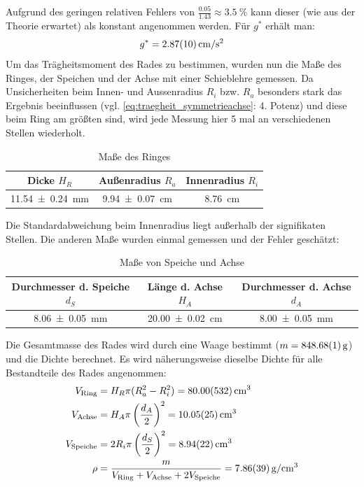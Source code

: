 Aufgrund des geringen relativen Fehlers von $\frac{0.05}{1.43}\approx\SI{3.5}{\percent}$ kann dieser (wie aus der Theorie erwartet) als konstant angenommen werden.
Für $g^*$ erhält man:
\begin{equation}
  g^*=\SI{2.87\pm .10}{cm/s^2}
  \label{eq:gsterngemessen}
\end{equation}
Um das Trägheitsmoment des Rades zu bestimmen, wurden nun die Maße des Ringes, der Speichen und der Achse mit einer Schieblehre gemessen. Da Unsicherheiten beim Innen- und Aussenradius $R_i$ bzw. $R_a$ besonders stark das Ergebnis beeinflussen (vgl. \cref{eq:traegheit_symmetrieachse}: 4. Potenz) und diese beim Ring am größten sind, wird jede Messung hier 5 mal an verschiedenen Stellen wiederholt.
\begin{table}[H]
  \centering
  \begin{tabular}{c | c | c}
    Dicke $H_R$ & Außenradius $R_a$ & Innenradius $R_i$ \\ \hline
    \SI{11.54\pm .24}{mm} & \SI{9.94\pm .07}{cm} & \SI{8.76}{cm}
  \end{tabular}
  \caption{Maße des Ringes}
  \label{tab:ringwerte}
\end{table}
Die Standardabweichung beim Innenradius liegt außerhalb der signifikaten Stellen.
Die anderen Maße wurden einmal gemessen und der Fehler geschätzt:
\begin{table}[H]
  \centering
  \begin{tabular}{c | c | c}
    Durchmesser d. Speiche $d_S$ & Länge d. Achse $H_A$ & Durchmesser d. Achse $d_A$ \\ \hline
    \SI{8.06\pm .05}{mm} & \SI{20.00\pm 0.02}{cm} & \SI{8.00\pm .05}{mm}
  \end{tabular}
  \caption{Maße von Speiche und Achse}
  \label{tab:speicheachse}
\end{table}
Die Gesamtmasse des Rades wird durch eine Waage bestimmt ($m=\SI{848.68\pm .01}{g}$) und die Dichte berechnet. Es wird näherungsweise dieselbe Dichte für alle Bestandteile des Rades angenommen:
\begin{align}
  V_{\text{Ring}}&=H_R\pi(R_a^2-R_i^2)=\SI{80.00\pm 5.32}{cm^3} \\
  V_{\text{Achse}}&=H_A\pi\left(\frac{d_A}{2}\right)^2=\SI{10.05\pm .25}{cm^3} \\
  V_{\text{Speiche}}&=2R_i\pi\left(\frac{d_S}{2}\right)^2=\SI{8.94\pm .22}{cm^3} \\
  \rho&=\frac{m}{V_{\text{Ring}}+V_{\text{Achse}}+2V_{\text{Speiche}}}=\SI{7.86\pm .39}{g/cm^3}
  \label{eq:dichte}
\end{align}
